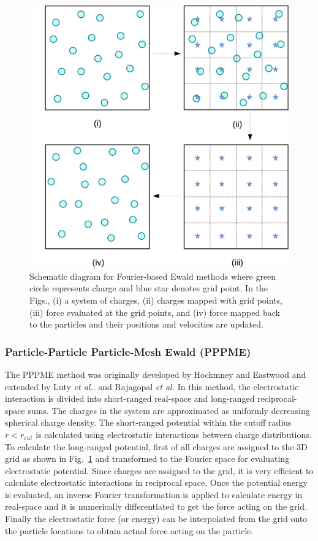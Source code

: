\begin{figure}[tpb]
  \begin{center}
    \centerline{\includegraphics[width = \linewidth]{PM_method.pdf}}
    \caption{Schematic diagram for Fourier-based Ewald methods where green circle represents charge and blue star denotes grid point. In the Figs., (i) a system of charges, (ii) charges mapped with grid points, (iii) force evaluated at the grid points, and (iv) force mapped back to the particles and their positions and velocities are updated. }
    \label{fig:PPPME}
  \end{center}
\end{figure}
\subsubsection{Particle-Particle Particle-Mesh Ewald (PPPME)}
\label{subsec:PPPME}
The PPPME method was originally developed by Hockmney and Eastwood \cite{Hockney88} and extended  by Luty \textit{et al.}.\cite{Luty94} and Rajagopal \textit{et al.} \cite{Rajagopal94} In this method, the electrostatic interaction is divided into short-ranged real-space and long-ranged reciprocal-space sums. The charges in the system are approximated as uniformly decreasing spherical charge density. The short-ranged potential within the cutoff radius $r < r_{cut}$ is calculated using electrostatic interactions between charge distributions. To calculate the long-ranged potential, first of all charges are assigned to the 3D grid as shown in Fig.~\ref{fig:PPPME} and transformed to the Fourier space for evaluating electrostatic potential. Since charges are assigned to the grid, it is very efficient to calculate electrostatic interactions in reciprocal space. Once the potential energy is evaluated, an inverse Fourier transformation is applied to calculate energy in real-space and it is numerically differentiated to get the force acting on the grid. Finally the electrostatic force (or energy) can be interpolated from the grid onto the particle locations to obtain actual force acting on the particle.

